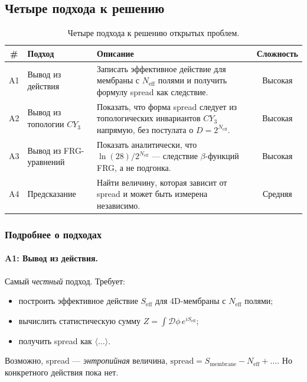 \documentclass[11pt,a4paper]{article}
\newcommand{\CY}{\ensuremath{CY_3}}
\newcommand{\Neff}{\ensuremath{N_{\text{eff}}}}
\theoremstyle{definition}
\begin{document}
\subsection{Четыре подхода к решению}
\label{subsec:open-approaches}

\begin{table}[ht]
\centering
\footnotesize
\caption{Четыре подхода к решению открытых проблем.}
\label{tab:four-approaches}
\begin{tabular}{@{}clp{4.5cm}c@{}}
\toprule
\# & Подход & Описание & Сложность \\
\midrule
A1 & Вывод из действия &
     Записать эффективное действие для мембраны с $\Neff$
     полями и получить формулу spread как следствие. &
     Высокая \\[0.3em]
A2 & Вывод из топологии $\CY$ &
     Показать, что форма spread следует из топологических
     инвариантов $\CY$ напрямую, без постулата о $D = 2^{\Neff}$. &
     Высокая \\[0.3em]
A3 & Вывод из FRG-уравнений &
     Показать аналитически, что $\ln(28)/2^{\Neff}$
     --- следствие $\beta$-функций FRG, а не подгонка. &
     Высокая \\[0.3em]
A4 & Предсказание &
     Найти величину, которая зависит от spread и может быть
     измерена независимо. &
     Средняя \\
\bottomrule
\end{tabular}
\end{table}

\subsubsection{Подробнее о подходах}

\paragraph{A1: Вывод из действия.}
Самый \emph{честный} подход. Требует:
\begin{itemize}
    \item построить эффективное действие $S_{\text{eff}}$ для
          4D-мембраны с $N_{\text{eff}}$ полями;
    \item вычислить статистическую сумму $Z = \int \mathcal{D}\phi
          \, e^{i S_{\text{eff}}}$;
    \item получить spread как $\langle \ldots \rangle$.
\end{itemize}
Возможно, spread --- \emph{энтропийная} величина,
$\text{spread} = S_{\text{membrane}} - N_{\text{eff}} + \ldots$.
Но конкретного действия пока нет.
\end{document}
